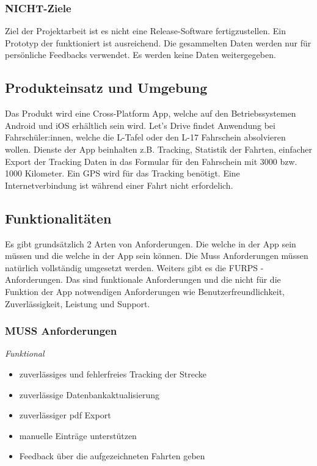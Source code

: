 \subsubsection{NICHT-Ziele}
Ziel der Projektarbeit ist es nicht eine Release-Software fertigzustellen. Ein Prototyp der funktioniert ist ausreichend. Die gesammelten Daten werden nur für persönliche Feedbacks verwendet. Es werden keine Daten weitergegeben.

\subsection{Produkteinsatz und Umgebung}

	Das Produkt wird eine Cross-Platform App, welche auf den Betriebssystemen Android und iOS erhältlich sein wird. Let's Drive findet Anwendung bei Fahrschüler:innen, welche die L-Tafel oder den L-17 Fahrschein absolvieren wollen. Dienste der App beinhalten z.B. Tracking, Statistik der Fahrten, einfacher Export der Tracking Daten in das Formular für den Fahrschein mit 3000 bzw. 1000 Kilometer. Ein GPS wird für das Tracking benötigt. Eine Internetverbindung ist während einer Fahrt nicht erfordelich.

\subsection{Funktionalitäten}

	Es gibt grundsätzlich 2 Arten von Anforderungen. Die welche in der App sein müssen und die welche in der App sein können. Die Muss Anforderungen müssen natürlich vollständig umgesetzt werden. Weiters gibt es die FURPS - Anforderungen. Das sind funktionale Anforderungen und die nicht für die Funktion der App notwendigen Anforderungen wie Benutzerfreundlichkeit, Zuverlässigkeit, Leistung und Support.
	\subsubsection{MUSS Anforderungen}
	\emph{Funktional}
		\begin{itemize}
			\item zuverlässiges und fehlerfreies Tracking der Strecke 
			\item zuverlässige Datenbankaktualisierung
			\item zuverlässiger pdf Export
			\item manuelle Einträge unterstützen
			\item Feedback über die aufgezeichneten Fahrten geben

		\end{itemize}
		
